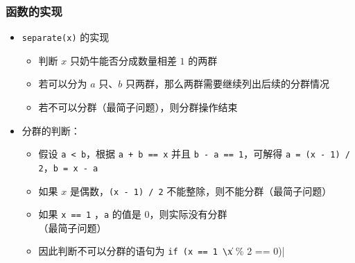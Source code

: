 \begin{frame}[fragile]
    \frametitle{函数的实现}

     {
        \begin{itemize}
            \item \lstinline|separate(x)| 的实现
             {
                \begin{itemize}
                    \item 判断 $x$ 只奶牛能否分成数量相差 $1$ 的两群
                    \item 若可以分为 $a$ 只、$b$ 只两群，那么两群需要继续列出后续的分群情况
                    \item 若不可以分群（最简子问题），则分群操作结束
                \end{itemize}
            }
             {
                
            }
             {
                
            }
        \end{itemize}
    }
    
     {
        \begin{itemize}
            \item 分群的判断：
            \begin{itemize}
                \item 假设 \lstinline|a < b|，根据 \lstinline|a + b == x| 并且 \lstinline|b - a == 1|，可解得 \lstinline|a = (x - 1) / 2|，\lstinline|b = x - a|
                \item 如果 $x$ 是偶数，\lstinline|(x - 1) / 2| 不能整除，则不能分群（最简子问题）
                \item 如果 \lstinline|x == 1| ，\lstinline|a| 的值是 $0$，则实际没有分群\\（最简子问题）
                \item 因此判断不可以分群的语句为 \lstinline|if (x == 1 \|\| x \% 2 == 0)|
            \end{itemize}
        \end{itemize}
    }

     {
        
    }

\end{frame}


